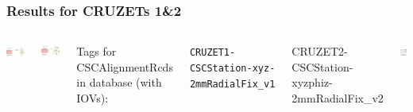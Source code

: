 \documentclass[compress]{beamer}
\begin{document}
\begin{frame}
\frametitle{Results for CRUZETs 1\&2}
\small

\begin{columns}
\includegraphics[height=3 cm]{cruzet1_results.png}

\vspace{0.5 cm}
\includegraphics[height=3.3 cm]{cruzet2_results.png}


\vspace{0.35 cm}
Tags for CSCAlignmentRcds in database (with IOVs):

\vspace{0.2 cm}
{\tt \tiny CRUZET1-CSCStation-xyz-2mmRadialFix\_v1

CRUZET2-CSCStation-xyzphiz-2mmRadialFix\_v2}

\vspace{0.4 cm}
\includegraphics[width=\linewidth]{hist_0and1.png}


\end{columns}
\end{frame}
\end{document}
